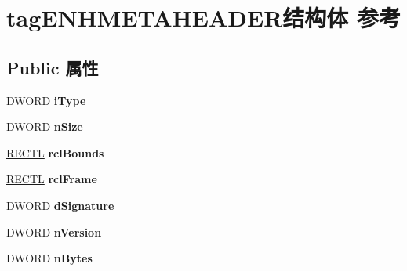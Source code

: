 \hypertarget{structtag_e_n_h_m_e_t_a_h_e_a_d_e_r}{}\section{tag\+E\+N\+H\+M\+E\+T\+A\+H\+E\+A\+D\+E\+R结构体 参考}
\label{structtag_e_n_h_m_e_t_a_h_e_a_d_e_r}
\subsection*{Public 属性}
\begin{DoxyCompactItemize}
\item 
\mbox{\label{structtag_e_n_h_m_e_t_a_h_e_a_d_e_r_af4a41a2b4acc36cb1359ac4062b09f6b}} 
D\+W\+O\+RD {\bfseries i\+Type}
\item 
\mbox{\label{structtag_e_n_h_m_e_t_a_h_e_a_d_e_r_aabb6a84fd80b263af6f7b1ac703b296e}} 
D\+W\+O\+RD {\bfseries n\+Size}
\item 
\mbox{\label{structtag_e_n_h_m_e_t_a_h_e_a_d_e_r_ae4f1611f4bfef59001738d516a72a77b}} 
\hyperlink{struct___r_e_c_t_l}{R\+E\+C\+TL} {\bfseries rcl\+Bounds}
\item 
\mbox{\label{structtag_e_n_h_m_e_t_a_h_e_a_d_e_r_a2b3467ca37bb8317307eb0f434e6a46f}} 
\hyperlink{struct___r_e_c_t_l}{R\+E\+C\+TL} {\bfseries rcl\+Frame}
\item 
\mbox{\label{structtag_e_n_h_m_e_t_a_h_e_a_d_e_r_aa0928b7c99fbb3e8c115c7eccf888191}} 
D\+W\+O\+RD {\bfseries d\+Signature}
\item 
\mbox{\label{structtag_e_n_h_m_e_t_a_h_e_a_d_e_r_af913c29fcea2b852bc84dd4816f7f075}} 
D\+W\+O\+RD {\bfseries n\+Version}
\item 
\mbox{\label{structtag_e_n_h_m_e_t_a_h_e_a_d_e_r_a3fb18194d9037a9dab54e37dc203903c}} 
D\+W\+O\+RD {\bfseries n\+Bytes}
\item 
\mbox{\label{structtag_e_n_h_m_e_t_a_h_e_a_d_e_r_a01e826f97df4a84bce1bd1f8169f4625}} 

\end{DoxyCompactItemize}
